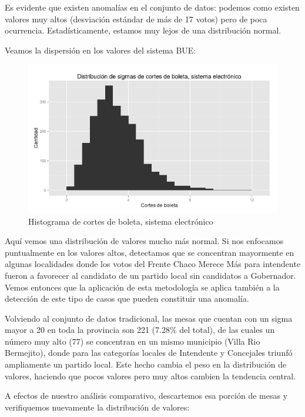 \documentclass[12pt,a4paper]{article}
\begin{document}
Es evidente que existen anomalías en el conjunto de datos: podemos como existen
valores muy altos (desviación estándar de más de 17 votos) pero de poca
ocurrencia. Estadísticamente, estamos muy lejos de una distribución normal.

Veamos la dispersión en los valores del sistema BUE:

\begin{figure}[h]
\centering
    \includegraphics[width=\textwidth]{sigmas_electronico}
\caption{Histograma de cortes de boleta, sistema electrónico}
\end{figure}

Aquí vemos una distribución de valores mucho más normal. Si nos enfocamos
puntualmente en los valores altos, detectamos que se concentran mayormente en
algunas localidades donde los votos del Frente Chaco Merece Más para intendente
fueron a favorecer al candidato de un partido local sin candidatos a Gobernador.
Vemos entonces que la aplicación de esta metodología se aplica también a la
detección de este tipo de casos que pueden constituir una anomalía.

Volviendo al conjunto de datos tradicional, las mesas que cuentan con
un sigma mayor a 20 en toda la provincia son 221 (7.28\% del total), de las
cuales un número muy alto (77) se concentran en un mismo municipio (Villa Rio
Bermejito), donde para las categorías locales de Intendente y Concejales triunfó
ampliamente un partido local. Este hecho cambia el peso en la distribución de
valores, haciendo que pocos valores pero muy altos cambien la tendencia central.

A efectos de nuestro análisis comparativo, descartemos esa porción de mesas y
verifiquemos nuevamente la distribución de valores:
\end{document}
